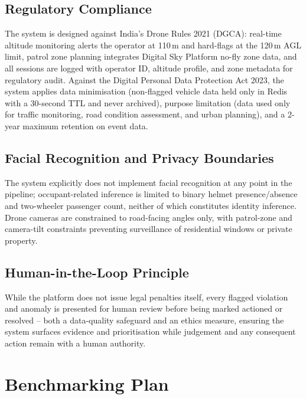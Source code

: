 \documentclass[conference]{IEEEtran}
\begin{document}
\subsection{Regulatory Compliance}

The system is designed against India's Drone Rules 2021 (DGCA): real-time altitude monitoring alerts the operator at 110\,m and hard-flags at the 120\,m AGL limit, patrol zone planning integrates Digital Sky Platform no-fly zone data, and all sessions are logged with operator ID, altitude profile, and zone metadata for regulatory audit. Against the Digital Personal Data Protection Act 2023, the system applies data minimisation (non-flagged vehicle data held only in Redis with a 30-second TTL and never archived), purpose limitation (data used only for traffic monitoring, road condition assessment, and urban planning), and a 2-year maximum retention on event data.

\subsection{Facial Recognition and Privacy Boundaries}

The system explicitly does not implement facial recognition at any point in the pipeline; occupant-related inference is limited to binary helmet presence/absence and two-wheeler passenger count, neither of which constitutes identity inference. Drone cameras are constrained to road-facing angles only, with patrol-zone and camera-tilt constraints preventing surveillance of residential windows or private property.

\subsection{Human-in-the-Loop Principle}

While the platform does not issue legal penalties itself, every flagged violation and anomaly is presented for human review before being marked actioned or resolved -- both a data-quality safeguard and an ethics measure, ensuring the system surfaces evidence and prioritisation while judgement and any consequent action remain with a human authority.

\section{Benchmarking Plan}
\label{sec:bench}
\end{document}

